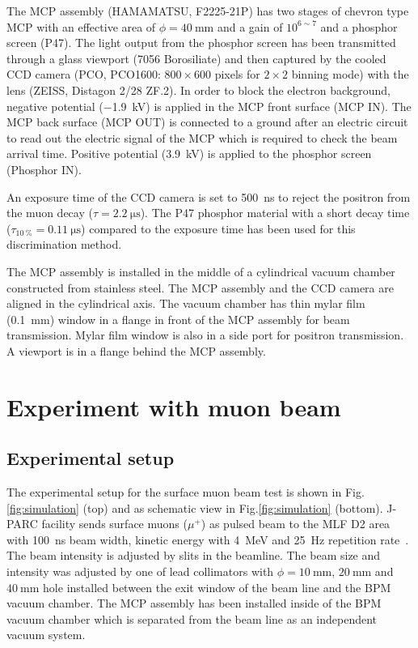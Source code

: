 \documentclass[preprint,3p,twocolumn]{elsarticle}
\begin{document}
The MCP assembly (HAMAMATSU, F2225-21P) has two stages of chevron type MCP with an effective area of $\phi = \SI{40}{\mm}$ and a gain of $10^{6\sim7}$ and a phosphor screen (P47). The light output from the phosphor screen has been transmitted through a glass viewport (7056 Borosiliate) and then captured by the cooled CCD camera (PCO, PCO1600: $800 \times 600$ pixels for $2 \times 2$ binning mode) with the lens (ZEISS, Distagon 2/28 ZF.2). 
In order to block the electron background, negative potential (\SI{-1.9}{\kilo\volt}) is applied in the MCP front surface (MCP IN).
The MCP back surface (MCP OUT) is connected to a ground after an electric circuit to read out the electric signal of the MCP which is required to check the beam arrival time.
Positive potential (\SI{3.9}{\kilo\volt}) is applied to the phosphor screen (Phosphor IN).

An exposure time of the CCD camera is set to \SI{500}{\nano\s} to reject the positron from the muon decay ($\tau = \SI{2.2}{\micro\s}$).
The P47 phosphor material with a short decay time ($\tau_{\SI{10}{\percent}} = \SI{0.11}{\micro\s}$) compared to the exposure time has been used for this discrimination method.

The MCP assembly is installed in the middle of a cylindrical vacuum chamber constructed from stainless steel.
The MCP assembly and the CCD camera are aligned in the cylindrical axis.
The vacuum chamber has thin mylar film (\SI{0.1}{mm}) window in a flange in front of the MCP assembly for beam transmission.
Mylar film window is also in a side port for positron transmission. 
A viewport is in a flange behind the MCP assembly.

\section{Experiment with muon beam}

\subsection{Experimental setup} 

The experimental setup for the surface muon beam test is shown in Fig.\ref{fig:simulation} {(top)} and as schematic view in Fig.\ref{fig:simulation} {(bottom)}.
J-PARC facility sends surface muons ($\mu^{+}$) as pulsed beam to the MLF D2 area with \SI{100}{\nano\s} beam width, kinetic energy with \SI{4}{\MeV} and \SI{25}{\hertz} repetition rate~\cite{D-line, D-line1}.
The beam intensity is adjusted by slits in the beamline.
The beam size and intensity was adjusted by one of lead collimators with $\phi=\SI{10}{\mm}$, $\SI{20}{\mm}$ and $\SI{40}{\mm}$ hole installed between the exit window of the beam line and the BPM vacuum chamber.
The MCP assembly has been installed inside of the BPM vacuum chamber which is separated from the beam line as an independent vacuum system.
\end{document}
